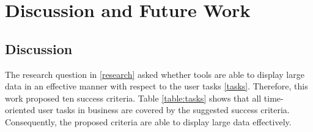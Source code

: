 \chapter{Discussion and Future Work}
\label{chap:conclusion}

\section{Discussion}
The research question in \ref{research} asked whether tools are able to display large data in an effective manner with respect to the user tasks \ref{tasks}. Therefore, this work proposed ten success criteria. Table \ref{table:tasks} shows that all time-oriented user tasks in business are covered by the suggested success criteria. Consequently, the proposed criteria are able to display large data effectively.
\newcommand*{\MyIndent}{\hspace*{1cm}} 
